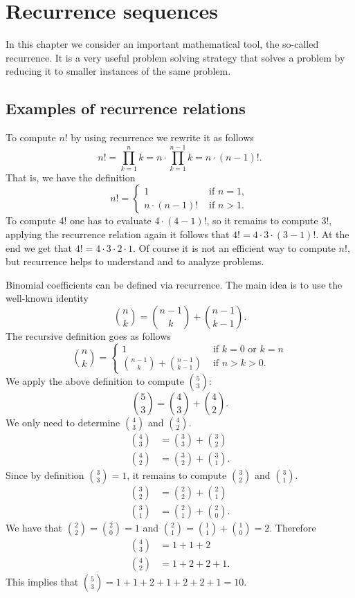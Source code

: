 
\chapter{Recurrence sequences}\label{Recurrence sequences}
In this chapter we consider an important mathematical tool, the so-called recurrence.
It is a very useful problem solving strategy that solves a problem by reducing it 
to smaller instances of the same problem.
\section{Examples of recurrence relations}
To compute $n!$ by using recurrence we rewrite it as follows
$$
n!=\prod_{k=1}^n k=n\cdot\prod_{k=1}^{n-1} k=n\cdot (n-1)!.
$$
That is, we have the definition
\begin{equation*}
n!=
\begin{cases}
1 & \mbox{ if }n=1,\\
n\cdot(n-1)! & \mbox{ if }n>1.
\end{cases}
\end{equation*}
To compute 4! one has to evaluate $4\cdot(4-1)!$, so it remains to compute 3!,
applying the recurrence relation again it follows that $4!=4\cdot 3\cdot(3-1)!$.
At the end we get that $4!=4\cdot 3\cdot 2\cdot 1$. Of course it is not an efficient
way to compute $n!$, but recurrence helps to understand and to analyze problems.

Binomial coefficients can be defined via recurrence. The main idea is to use the 
well-known identity
$$
\binom{n}{k}=\binom{n-1}{k}+\binom{n-1}{k-1}.
$$
The recursive definition goes as follows
\begin{equation*}
\binom{n}{k}=
\begin{cases}
1 & \mbox{ if }k=0\mbox{ or }k=n\\
\binom{n-1}{k}+\binom{n-1}{k-1} & \mbox{ if }n>k>0.
\end{cases}
\end{equation*}
We apply the above definition to compute $\binom{5}{3}:$
$$
\binom{5}{3}=\binom{4}{3}+\binom{4}{2}.
$$
We only need to determine $\binom{4}{3}$ and $\binom{4}{2}$.
\begin{align*}
\binom{4}{3}&=\binom{3}{3}+\binom{3}{2}\\
\binom{4}{2}&=\binom{3}{2}+\binom{3}{1}.
\end{align*}
Since by definition $\binom{3}{3}=1$, it remains to compute $\binom{3}{2}$ and $\binom{3}{1}$.
\begin{align*}
\binom{3}{2}&=\binom{2}{2}+\binom{2}{1}\\
\binom{3}{1}&=\binom{2}{1}+\binom{2}{0}.
\end{align*}
We have that $\binom{2}{2}=\binom{2}{0}=1$ and $\binom{2}{1}=\binom{1}{1}+\binom{1}{0}=2$.
Therefore
\begin{align*}
\binom{4}{3}&=1+1+2\\
\binom{4}{2}&=1+2+2+1.
\end{align*}
This implies that $\binom{5}{3}=1+1+2+1+2+2+1=10$.

